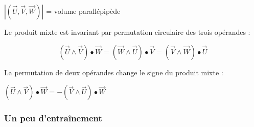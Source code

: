\(\left| (\overrightarrow{U},\overrightarrow{V},\overrightarrow{W}) \right|\)
= volume parallépipède

Le produit mixte est invariant par permutation circulaire des trois
opérandes :

\[(\overrightarrow{U} \land \overrightarrow{V}) \bullet \overrightarrow{W} = (\overrightarrow{W} \land \overrightarrow{U}) \bullet \overrightarrow{V} = (\overrightarrow{V} \land \overrightarrow{W}) \bullet \overrightarrow{U}\]

La permutation de deux opérandes change le signe du produit mixte :

\((\overrightarrow{U} \land \overrightarrow{V}) \bullet \overrightarrow{W} = - (\overrightarrow{V} \land \overrightarrow{U}) \bullet \overrightarrow{W}\)

\subsubsection{Un peu d'entraînement}\label{un-peu-dentrauxeenement}

